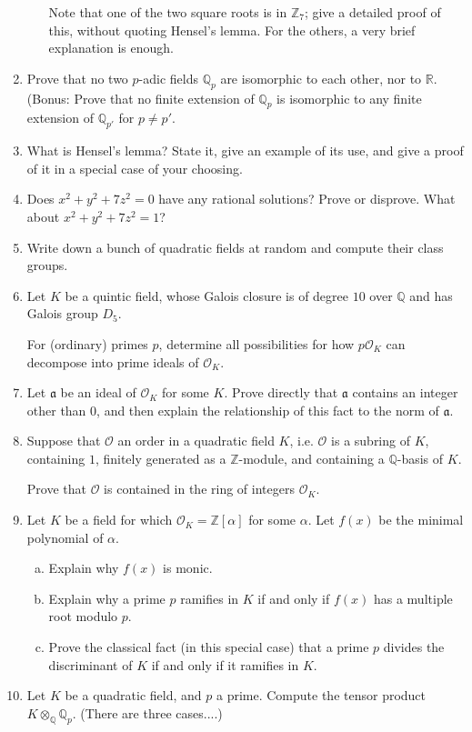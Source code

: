 \documentclass[12pt]{amsart}
\begin{document}
\begin{enumerate}[1.]
\begin{enumerate}[(a)]
Note that one of the two square roots is in $\mathbb{Z}_7$; give a detailed proof of this, without
quoting Hensel's lemma. For the others, a very brief explanation is enough.
\end{enumerate}
\vskip 0.5cm
\item
Prove that no two $p$-adic fields $\mathbb{Q}_p$ are isomorphic to each other, nor to $\mathbb{R}$.
(Bonus: Prove that no finite extension of $\mathbb{Q}_p$ is isomorphic to any finite extension of
$\mathbb{Q}_{p'}$ for $p \neq p'$.

\vskip 0.5cm
\item
What is Hensel's lemma? State it, give an example of its use, and give a proof of it in a special case
of your choosing.

\vskip 0.5cm
\item
Does $x^2 + y^2 + 7z^2 = 0$ have any rational solutions? Prove or disprove. What about
$x^2 + y^2 + 7z^2 = 1$?

\vskip 0.5cm
\item
Write down a bunch of quadratic fields at random and compute their class groups.

\vskip 0.5cm
\item
Let $K$ be a quintic field, whose Galois closure is of degree $10$ over $\mathbb{Q}$ and
has Galois group $D_5$.

For (ordinary) primes $p$, determine all possibilities for how $p \mathcal{O}_K$ can decompose
into prime ideals of $\mathcal{O}_K$.

\vskip 0.5cm
\item
Let $\mathfrak{a}$ be an ideal of $\mathcal{O}_K$ for some $K$. Prove directly 
that $\mathfrak{a}$ contains an integer other than $0$, and then explain the relationship of
this fact to the norm of $\mathfrak{a}$.

\vskip 0.5cm
\item
Suppose that $\mathcal{O}$ an order in a quadratic field $K$, i.e. $\mathcal{O}$ is a subring
of $K$, containing $1$, finitely generated as a $\mathbb{Z}$-module, and containing a
$\mathbb{Q}$-basis of $K$.

Prove that $\mathcal{O}$ is contained in the ring of integers $\mathcal{O}_K$.

\vskip 0.5cm
\item
Let $K$ be a field for which $\mathcal{O}_K = \mathbb{Z}[\alpha]$ for some $\alpha$. Let
$f(x)$ be the minimal polynomial of $\alpha$.
\begin{enumerate}[(a)]
\item
Explain why $f(x)$ is monic.
\item
Explain why a prime $p$ ramifies in $K$ if and only if $f(x)$ has a multiple root modulo $p$.
\item
Prove the classical fact (in this special case)
that a prime $p$ divides the discriminant of $K$ if and only if it ramifies in $K$.
\end{enumerate}

\vskip 0.5cm
\item
Let $K$ be a quadratic field, and $p$ a prime. Compute the tensor product $K \otimes_{\mathbb{Q}} \mathbb{Q}_p$.
(There are three cases....)
\end{enumerate}
\end{document}
